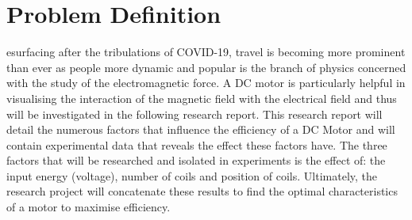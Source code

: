 %
%
%

\chapter*{Problem Definition}
esurfacing after the tribulations of COVID-19, travel is becoming more prominent than ever as people more dynamic and popular is the branch of physics concerned with the study of the electromagnetic force. A DC motor is particularly helpful in visualising the interaction of the magnetic field with the electrical field and thus will be investigated in the following research report. This research report will detail the numerous factors that influence the efficiency of a DC Motor and will contain experimental data that reveals the effect these factors have. The three factors that will be researched and isolated in experiments is the effect of: the input energy (voltage), number of coils and position of coils. Ultimately, the research project will concatenate these results to find the optimal characteristics of a motor to maximise efficiency. 

\clearpage 
